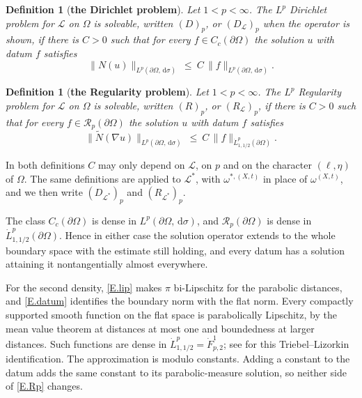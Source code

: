 \documentclass[12pt,leqno]{amsart}
\numberwithin{equation}{section}
\newcommand{\om}{\Omega}
\newcommand{\pom}{\partial\Omega}
\newcommand{\LL}{\mathcal L}
\newcommand{\Nt}{\widetilde N}
\renewcommand{\d}{\,\mathrm d}
\theoremstyle{plain}
\newtheorem{definition}[equation]{Definition}
\theoremstyle{remark}
\begin{document}
\begin{definition}[\bf the Dirichlet problem]\label{D.Dp}
Let $1<p<\infty$. The $L^p$ Dirichlet problem for $\LL$ on $\om$ is
\emph{solvable}, written $(D)_p$, or $(D_\LL)_p$ when the operator is shown, if there is $C>0$ such that for every $f\in C_c(\pom)$ the solution
$u$ with datum $f$ satisfies
\begin{equation}\label{E.Dp}
  \big\|N(u)\big\|_{L^p(\pom,\d\sigma)}\ \le\
  C\,\|f\|_{L^p(\pom,\d\sigma)} .
\end{equation}
\end{definition}

\begin{definition}[\bf the Regularity problem]\label{D.Rp}
Let $1<p<\infty$. The $L^p$ Regularity problem for $\LL$ on $\om$ is
\emph{solvable}, written $(R)_p$, or $(R_\LL)_p$, if there is $C>0$ such that
for every $f\in\mathcal R_p(\pom)$ the solution $u$ with datum $f$ satisfies
\begin{equation}\label{E.Rp}
  \big\|\Nt(\nabla u)\big\|_{L^p(\pom,\d\sigma)}\ \le\
  C\,\|f\|_{\dot L^p_{1,1/2}(\pom)} .
\end{equation}
\end{definition}

\noindent In both definitions $C$ may only depend on $\LL$, on $p$ and on the
character $(\ell,\eta)$ of $\om$. The same definitions are
applied to $\LL^*$, with $\omega^{*,(X,t)}$ in place of $\omega^{(X,t)}$, and we
then write $(D_{\LL^*})_p$ and $(R_{\LL^*})_p$.\medskip

\noindent The class $C_c(\pom)$ is dense in $L^p(\pom,\d\sigma)$, and
$\mathcal R_p(\pom)$ is dense in $\dot L^p_{1,1/2}(\pom)$. Hence in either case
the solution operator extends to the whole boundary space with the estimate
still holding, and every datum has a solution attaining it nontangentially
almost everywhere.

\noindent For the second density, \eqref{E.lip} makes $\pi$ bi-Lipschitz
for the parabolic distances, and \eqref{E.datum} identifies the boundary
norm with the flat norm. Every compactly supported smooth function on the
flat space is parabolically Lipschitz, by the mean value theorem at distances
at most one and boundedness at larger distances. Such functions are dense
in $\dot L^p_{1,1/2}=\dot F^1_{p,2}$; see \cite[\S2.3]{DN} for this
Triebel--Lizorkin identification. The approximation is modulo constants.
Adding a constant to the datum adds the same constant to its
parabolic-measure solution, so neither side of \eqref{E.Rp} changes.
\end{document}
